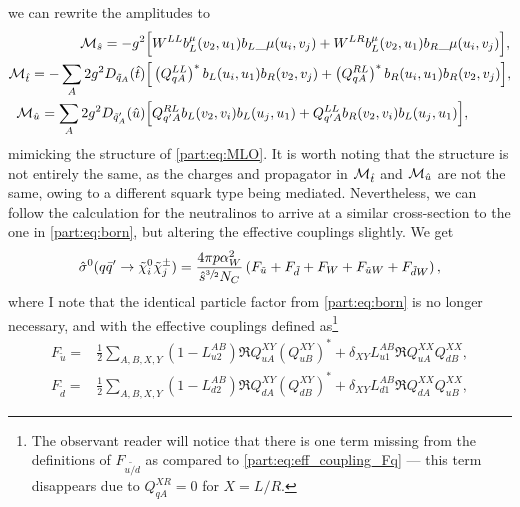\documentclass[../main.tex]{subfiles}
\begin{document}
we can rewrite the amplitudes to
\begin{subequations}
  \begin{align}
    \mathcal{M}_{\hat{s}} = -g^2 \Big[                                        &
      W^{LL} b_L^\mu(v_2, u_1){b_L}\_{\mu}(u_i, v_j) + W^{LR} b_L^\mu{(v_2, u_1)b_R}\_{\mu}(u_i, v_j)
    \Big],                                                             \\
    \mathcal{M}_{\hat{t}} = -\sum_A 2g^2 D_{\tilde{q}_A}(\hat{t}) \Big[       &
      \left(Q_{qA}^{LL}\right)^\ast b_L(u_i, u_1) b_R(v_2, v_j) + \left(Q_{qA}^{RL}\right)^\ast b_R(u_i, u_1) b_R(v_2, v_j)
    \Big],                                                             \\
    \mathcal{M}_{\hat{u}} = \sum_A 2g^2 D_{\tilde{q}_A^\prime}(\hat{u}) \Big[ &
      Q_{q^\prime A}^{RL} b_L(v_2, v_i) b_L(u_j, u_1) + Q_{q^\prime A}^{LL} b_R(v_2, v_i) b_L(u_j, u_1)
      \Big],
  \end{align}
\end{subequations}
mimicking the structure of \cref{part:eq:MLO}.
It is worth noting that the structure is not entirely the same, as the charges and propagator in \(\mathcal{M}_{\hat{t}}\) and \(\mathcal{M}_{\hat{u}}\) are not the same, owing to a different squark type being mediated.
Nevertheless, we can follow the calculation for the neutralinos to arrive at a similar cross-section to the one in \cref{part:eq:born}, but altering the effective couplings slightly.
We get
\begin{equation}
  \hat\sigma^0(q\bar{q}^\prime \to \tilde\chi^0_i \tilde\chi^\pm_j) = \frac{4 \pi p \alpha_W^2}{\hat{s}^{\sfrac{3}{2}} N_C} \left(F_{\tilde{u}} + F_{\tilde{d}} + F_W + F_{\tilde{u}W} + F_{\tilde{d}W}\right),
\end{equation}
where I note that the identical particle factor from \cref{part:eq:born} is no longer necessary, and with the effective couplings defined as\footnote{The observant reader will notice that there is one term missing from the definitions of \(F_{\tilde{u/d}}\) as compared to \cref{part:eq:eff_coupling_Fq} --- this term disappears due to \(Q_{qA}^{XR} = 0\) for \(X = L/R\).}
\\
\begin{subequations}
  \begin{align}
    F_{\tilde{u}} = & \frac{1}{2} \sum_{A,B,X,Y} (1 - L_{u2}^{AB}) \Re{Q_{uA}^{XY} (Q_{uB}^{XY})^\ast} + \delta_{XY} L_{u1}^{AB} \Re{Q_{uA}^{XX} Q_{dB}^{XX}}, \\
    F_{\tilde{d}} = & \frac{1}{2} \sum_{A,B,X,Y} (1 - L_{d2}^{AB}) \Re{Q_{dA}^{XY} (Q_{dB}^{XY})^\ast} + \delta_{XY} L_{d1}^{AB} \Re{Q_{dA}^{XX} Q_{uB}^{XX}},
  \end{align}
\end{subequations}
\end{document}

